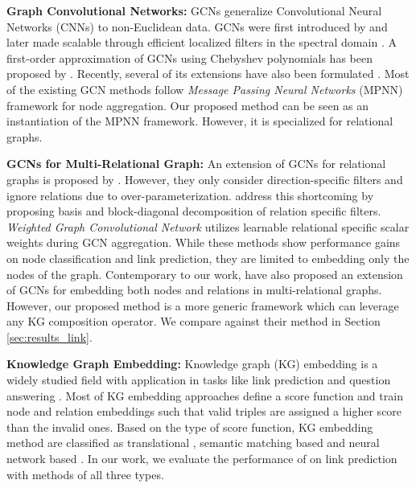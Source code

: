 \documentclass{article} \usepackage{iclr2020_conference,times}
\begin{document}
\textbf{Graph Convolutional Networks:} GCNs generalize Convolutional Neural Networks (CNNs) to non-Euclidean data. GCNs were first introduced by \cite{Bruna2013} and later made scalable through efficient localized filters in the spectral domain \citep{Defferrard2016}. A first-order approximation of GCNs using Chebyshev polynomials has been proposed by \cite{Kipf2016}. Recently, several of its extensions have also been formulated \citep{graphsage,gat,gin}. Most of the existing GCN methods follow \textit{Message Passing Neural Networks} (MPNN) framework \citep{mpnn} for node aggregation. 
Our proposed method can be seen as an instantiation of the MPNN framework. However, it is specialized for relational graphs. 






\textbf{GCNs for Multi-Relational Graph:} An extension of GCNs for relational graphs is proposed by \cite{gcn_srl}. However, they only consider direction-specific filters and ignore relations due to over-parameterization. \cite{r_gcn} address this shortcoming by proposing basis and block-diagonal decomposition of relation specific filters. \textit{Weighted Graph Convolutional Network}  \citep{sacn_paper} utilizes learnable relational specific scalar weights during GCN aggregation. While these methods show performance gains on node classification and link prediction, they are limited to embedding only the nodes of the graph. 
Contemporary to our work, \cite{vrgcn} have also proposed an extension of GCNs for embedding both nodes and relations in multi-relational graphs. However, our proposed method is a more generic framework which can leverage any KG composition operator. We compare against their method in Section \ref{sec:results_link}.



\textbf{Knowledge Graph Embedding:} 
Knowledge graph (KG) embedding is a widely studied field \citep{survey2016nickel, survey2017} with application in tasks like link prediction and question answering \citep{kg_question_answering}. Most of KG embedding approaches define a score function and train node and relation embeddings such that valid triples are assigned a higher score than the invalid ones. Based on the type of score function, KG embedding method are classified as translational \citep{transe,transh}, semantic matching based \citep{distmult,hole} and neural network based \citep{ntn_kg,conve}. In our work, we evaluate the performance of \method{} on link prediction with methods of all three types.
\end{document}
